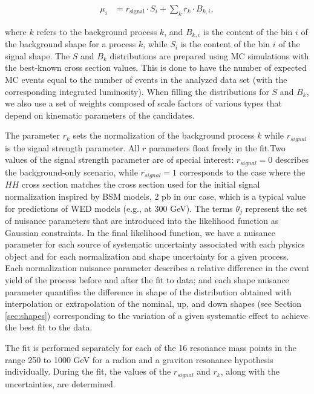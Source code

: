 \begin{align*}
\mu_{i} &= r_{\text{signal}} \cdot S_{i} + \sum_{k}r_{k}\cdot B_{k,i},
\end{align*}

\noindent where $k$ refers to the background process $k$, and $B_{k,i}$ is the content of the bin $i$ of the background
shape for a process $k$, while $S_i$ is the content of the bin $i$ of the signal shape. The $S$ and $B_k$ distributions are prepared using MC simulations with the best-known cross section values. This is done to have the number of expected MC events equal to the number of events in the analyzed data set (with the corresponding integrated luminosity). When filling the distributions for $S$ and $B_k$, we also use a set of weights composed of scale factors of various types that depend on kinematic parameters of the candidates.

The parameter $r_k$ sets the normalization of the background process $k$ while $r_{signal}$ is the signal strength parameter. All $r$ parameters float freely in the fit.Two values of the signal strength parameter are of special interest: $r_{signal} = 0$ describes the background-only scenario, while $r_{signal} = 1$ corresponds to the case where the $HH$ cross section matches the cross section used for the initial signal normalization inspired by BSM models, 2 pb in our case, which is a typical value for predictions of WED models (e.g., at 300 GeV). The terms $\theta_j$ represent the set of nuisance parameters that are introduced into the likelihood function as Gaussian constraints. In the final likelihood function, we have a nuisance parameter for each source of systematic uncertainty associated with each physics object and for each normalization and shape uncertainty for a given process. Each normalization nuisance parameter describes a relative difference in the event yield of the process before and after the fit to data; and each shape nuisance parameter quantifies the difference in shape of the \mTHH distribution obtained with interpolation or extrapolation of the nominal, up, and down shapes (see Section \ref{sec:shapes}) corresponding to the variation of a given systematic effect to achieve the best fit to the data.

The fit is performed separately for each of the 16 resonance mass points in the range 250 to 1000 GeV for a radion and a graviton resonance hypothesis individually. During the fit, the values of the $r_{signal}$ and $r_k$, along with the uncertainties, are determined. 

